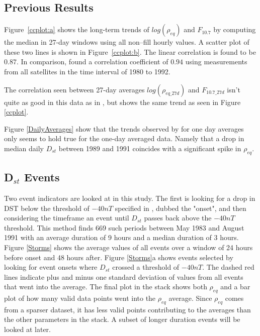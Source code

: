 \documentclass[10pt,twocolumn]{article}
\begin{document}
\subsection{Previous Results}

Figure~\ref{ccplot:a} shows the long-term trends of $log(\rho_{eq})$ and $F_{10.7}$ by computing the median in 27-day windows using all non--fill hourly values.  A scatter plot of these two lines is shown in Figure~\ref{ccplot:b}.  The linear correlation is found to be $0.87$.  In comparison, \cite{Takahashi2010} found a correlation coefficient of $0.94$ using measurements from all satellites in the time interval of 1980 to 1992.

The correlation seen between 27-day averages $log(\rho_{eq\_27d})$ and $F_{10.7\_27d}$ isn't quite as good in this data as in \cite{Takahashi2010}, but shows the same trend as seen in Figure \ref{ccplot}.

Figure \ref{DailyAverages} show that the trends observed by \cite{Takahashi2010} for one day averages only seems to hold true for the one-day averaged data. Namely that a drop in median daily $D_{st}$ between 1989 and 1991 coincides with a significant spike in $\rho_{eq}$. 

\subsection{D$_{st}$ Events}
Two event indicators are looked at in this study. The first is looking for a drop in DST below the threshold of $-40nT$ specified in \cite{Takahashi2010}, dubbed the "onset", and then considering the timeframe an event until $D_{st}$ passes back above the $-40nT$ threshold. This method finds 669 such periods between May 1983 and August 1991 with an average duration of 9 hours and a median duration of 3 hours. Figure \ref{Storms} shows the average values of all events over a window of 24 hours before onset and 48 hours after. Figure \ref{Storms}a shows events selected by looking for event onsets where $D_{st}$ crossed a threshold of $-40nT$. The dashed red lines indicate plus and minus one standard deviation of values from all events that went into the average. The final plot in the stack shows both $\rho_{eq}$ and a bar plot of how many valid data points went into the $\rho_{eq}$ average. Since $\rho_{eq}$ comes from a sparser dataset, it has less valid points contributing to the averages than the other parameters in the stack. A subset of longer duration events will be looked at later. 
\end{document}
